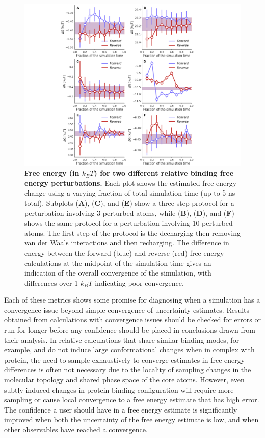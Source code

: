 \documentclass[9pt,bestpractices]{livecoms}
\begin{document}
\begin{figure}
    \centering
    \includegraphics[width=0.95\linewidth]{figures/fig10_forward_reverse/Figure.pdf}
    \caption{\textbf{Free energy (in $k_{B}T$) for two different relative binding free energy perturbations.} 
    Each plot shows the estimated free energy change using a varying fraction of total simulation time (up to 5 ns total). 
    Subplots (\textbf{A}), (\textbf{C}), and (\textbf{E}) show a three step protocol for a perturbation involving 3 perturbed atoms, while (\textbf{B}), (\textbf{D}), and (\textbf{F}) shows the same protocol for a perturbation involving 10 perturbed atoms. The first step of the protocol is the decharging then removing van der Waals interactions and then recharging. The difference in energy between the forward (blue) and reverse (red) free energy calculations at the midpoint of the simulation time gives an indication of the overall convergence of the simulation, with differences over 1 $k_{B}T$ indicating poor convergence.}
    \label{fig:convergence_forward_reverse}
\end{figure}

Each of these metrics shows some promise for diagnosing when a simulation has a convergence issue beyond simple convergence of uncertainty estimates. 
Results obtained from calculations with convergence issues should be checked for errors or run for longer before any confidence should be placed in conclusions drawn from their analysis.
In relative calculations that share similar binding modes, for example, and do not induce large conformational changes when in complex with protein, the need to sample exhaustively to converge estimates in free energy differences is often not necessary due to the locality of sampling changes in the molecular topology and shared phase space of the core atoms.
However, even subtly induced changes in protein binding configuration will require more sampling or cause local convergence to a free energy estimate that has high error.
The confidence a user should have in a free energy estimate is significantly improved when both the uncertainty of the free energy estimate is low, and when other observables have reached a convergence.
\end{document}
